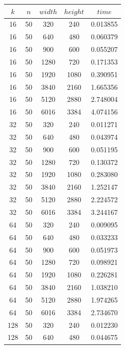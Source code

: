 \documentclass[11pt]{article}
\begin{document}
\begin{table}[H]
    \centering
    \label{dat:gpu}
    \begin{tabular}{c|c|c|c|c}
        $k$ & $n$ & $width$ & $height$ & $time$   \\
        \hline
        16  & 50  & 320     & 240      & 0.013855 \\
        16  & 50  & 640     & 480      & 0.060379 \\
        16  & 50  & 900     & 600      & 0.055207 \\
        16  & 50  & 1280    & 720      & 0.171353 \\
        16  & 50  & 1920    & 1080     & 0.390951 \\
        16  & 50  & 3840    & 2160     & 1.665356 \\
        16  & 50  & 5120    & 2880     & 2.748004 \\
        16  & 50  & 6016    & 3384     & 4.074156 \\
        32  & 50  & 320     & 240      & 0.011271 \\
        32  & 50  & 640     & 480      & 0.043974 \\
        32  & 50  & 900     & 600      & 0.051195 \\
        32  & 50  & 1280    & 720      & 0.130372 \\
        32  & 50  & 1920    & 1080     & 0.283080 \\
        32  & 50  & 3840    & 2160     & 1.252147 \\
        32  & 50  & 5120    & 2880     & 2.224572 \\
        32  & 50  & 6016    & 3384     & 3.244167 \\
        64  & 50  & 320     & 240      & 0.009095 \\
        64  & 50  & 640     & 480      & 0.033233 \\
        64  & 50  & 900     & 600      & 0.051973 \\
        64  & 50  & 1280    & 720      & 0.098921 \\
        64  & 50  & 1920    & 1080     & 0.226281 \\
        64  & 50  & 3840    & 2160     & 1.038210 \\
        64  & 50  & 5120    & 2880     & 1.974265 \\
        64  & 50  & 6016    & 3384     & 2.734670 \\
        128 & 50  & 320     & 240      & 0.012230 \\
        128 & 50  & 640     & 480      & 0.044675 \\

\end{tabular}
\end{table}
\end{document}
